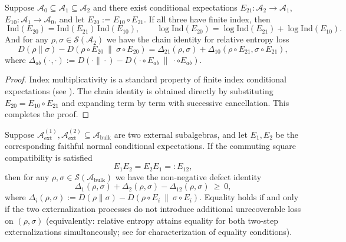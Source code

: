 \begin{corollary}\label{cor:dephys-index-chain-rule}
Suppose \(\mathcal{A}_0\subseteq \mathcal{A}_1\subseteq \mathcal{A}_2\) and there exist conditional expectations
\(
E_{21}:\mathcal{A}_2\to\mathcal{A}_1
\), \(
E_{10}:\mathcal{A}_1\to\mathcal{A}_0
\), and let \(E_{20}:=E_{10}\circ E_{21}\).
If all three have finite index, then
\[
\boxed{\;
\mathrm{Ind}(E_{20})=\mathrm{Ind}(E_{21})\,\mathrm{Ind}(E_{10}),\qquad
\log\mathrm{Ind}(E_{20})=\log\mathrm{Ind}(E_{21})+\log\mathrm{Ind}(E_{10}).\;}
\]
And for any \(\rho,\sigma\in\mathcal{S}(\mathcal{A}_2)\) we have the chain identity for relative entropy loss
\[
\boxed{\;
D(\rho\|\sigma)-D(\rho\circ E_{20}\ \|\ \sigma\circ E_{20})
=\Delta_{21}(\rho,\sigma)+\Delta_{10}(\rho\circ E_{21},\sigma\circ E_{21}),\;}
\]
where \(\Delta_{ab}(\cdot,\cdot):=D(\cdot\|\cdot)-D(\cdot\circ E_{ab}\ \|\ \cdot\circ E_{ab})\).
\end{corollary}

\begin{proof}
Index multiplicativity is a standard property of finite index conditional expectations (see \cite{PimsnerPopa1986EntropyIndexSubfactors,Hiai1991MinimumIndexSubfactorsEntropyII}).
The chain identity is obtained directly by substituting \(E_{20}=E_{10}\circ E_{21}\) and expanding term by term with successive cancellation. This completes the proof.
\end{proof}

\begin{proposition}\label{prop:dephys-commuting-square-mutual-information-defect}
Suppose \(\mathcal{A}_{\mathrm{ext}}^{(1)},\mathcal{A}_{\mathrm{ext}}^{(2)}\subseteq\mathcal{A}_{\mathrm{bulk}}\) are two external subalgebras,
and let \(E_1,E_2\) be the corresponding faithful normal conditional expectations.
If the commuting square compatibility is satisfied
\[
E_1E_2=E_2E_1=:E_{12},
\]
then for any \(\rho,\sigma\in\mathcal{S}(\mathcal{A}_{\mathrm{bulk}})\) we have the non-negative defect identity
\begin{equation}\label{eq:dephys-mutual-information-defect}
\boxed{\;
\Delta_{1}(\rho,\sigma)+\Delta_{2}(\rho,\sigma)-\Delta_{12}(\rho,\sigma)\ \ge\ 0,\;}
\end{equation}
where \(\Delta_i(\rho,\sigma):=D(\rho\|\sigma)-D(\rho\circ E_i\ \|\ \sigma\circ E_i)\).
Equality holds if and only if the two externalization processes do not introduce additional unrecoverable loss on \((\rho,\sigma)\) (equivalently: relative entropy attains equality for both two-step externalizations simultaneously; see \cite{Petz2003MonotonicityRelativeEntropyRevisited} for characterization of equality conditions).
\end{proposition}

